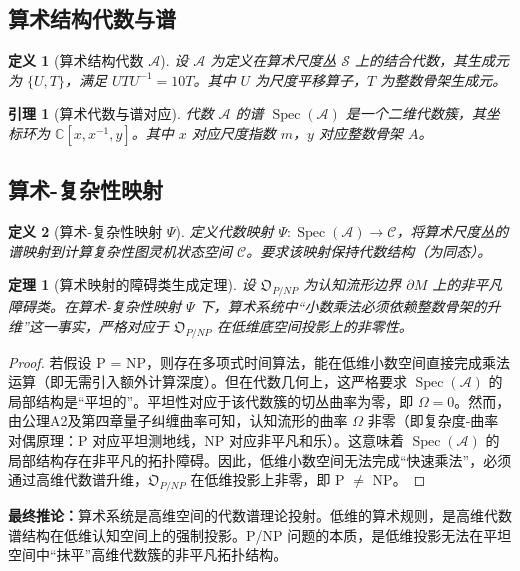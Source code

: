 \documentclass[11pt,a4paper]{article}
\newtheorem{theorem}{定理}
\newtheorem{definition}{定义}
\newtheorem{lemma}{引理}
\begin{document}
\subsection{算术结构代数与谱}
\begin{definition}[算术结构代数 \(\mathcal A\)]
设 \(\mathcal A\) 为定义在算术尺度丛 \(\mathcal S\) 上的结合代数，其生成元为 \(\{U,T\}\)，满足 \(UTU^{-1}=10T\)。其中 \(U\) 为尺度平移算子，\(T\) 为整数骨架生成元。
\end{definition}

\begin{lemma}[算术代数与谱对应]
代数 \(\mathcal A\) 的谱 \(\operatorname{Spec}(\mathcal A)\) 是一个二维代数簇，其坐标环为 \(\mathbb C[x,x^{-1},y]\)。其中 \(x\) 对应尺度指数 \(m\)，\(y\) 对应整数骨架 \(A\)。
\end{lemma}

\subsection{算术-复杂性映射}
\begin{definition}[算术-复杂性映射 \(\Psi\)]
定义代数映射 \(\Psi:\operatorname{Spec}(\mathcal A)\to \mathcal C\)，将算术尺度丛的谱映射到计算复杂性图灵机状态空间 \(\mathcal C\)。要求该映射保持代数结构（为同态）。
\end{definition}

\begin{theorem}[算术映射的障碍类生成定理]
设 \(\mathfrak{O}_{P/NP}\) 为认知流形边界 \(\partial M\) 上的非平凡障碍类。在算术-复杂性映射 \(\Psi\) 下，算术系统中“小数乘法必须依赖整数骨架的升维”这一事实，严格对应于 \(\mathfrak{O}_{P/NP}\) 在低维底空间投影上的非零性。
\end{theorem}
\begin{proof}
若假设 P = NP，则存在多项式时间算法，能在低维小数空间直接完成乘法运算（即无需引入额外计算深度）。但在代数几何上，这严格要求 \(\operatorname{Spec}(\mathcal A)\) 的局部结构是“平坦的”。平坦性对应于该代数簇的切丛曲率为零，即 \(\Omega = 0\)。然而，由公理A2及第四章量子纠缠曲率可知，认知流形的曲率 \(\Omega\) 非零（即复杂度-曲率对偶原理：P 对应平坦测地线，NP 对应非平凡和乐）。这意味着 \(\operatorname{Spec}(\mathcal A)\) 的局部结构存在非平凡的拓扑障碍。因此，低维小数空间无法完成“快速乘法”，必须通过高维代数谱升维，\(\mathfrak{O}_{P/NP}\) 在低维投影上非零，即 P \(\neq\) NP。
\end{proof}

\textbf{最终推论：}算术系统是高维空间的代数谱理论投射。低维的算术规则，是高维代数谱结构在低维认知空间上的强制投影。P/NP 问题的本质，是低维投影无法在平坦空间中“抹平”高维代数簇的非平凡拓扑结构。
\end{document}
